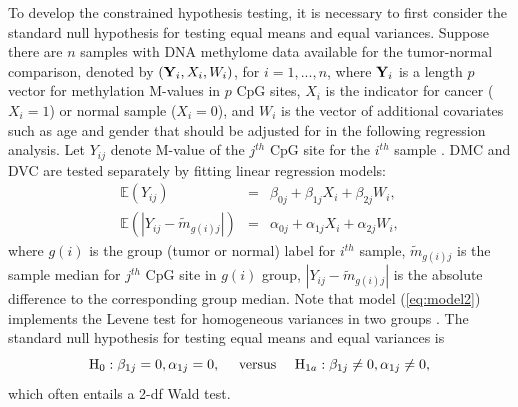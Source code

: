 \documentclass{statsoc}
\begin{document}
 To develop the constrained hypothesis testing, it is necessary to first consider the standard null hypothesis for testing equal means and equal variances. Suppose there are $n$ samples with DNA methylome data available for the tumor-normal comparison, denoted by $(\mbox{\bf Y}_i,X_i,W_i)$, for $i=1,...,n$, where $\mbox{\bf Y}_i$ is a length $p$ vector for methylation M-values in $p$ CpG sites, $X_i$ is the indicator for cancer ($X_i=1$) or normal sample ($X_i=0$), and $W_i$ is the vector of additional covariates such as age and gender that should be adjusted for in the following regression analysis. Let $Y_{ij}$ denote M-value of the $j^{th}$ CpG site for the $i^{th}$ sample . DMC and DVC are tested separately by fitting linear regression models:
\begin{eqnarray}
  \mathbb{E}(Y_{ij})&=& \beta_{0j} + \beta_{1j} X_i + \beta_{2j} W_i,  \label{eq:model1} \\
  \mathbb{E}(|Y_{ij} - \widetilde{m}_{g(i)j}|)&=& \alpha_{0j} + \alpha_{1j} X_i + \alpha_{2j}W_i,  \label{eq:model2}
\end{eqnarray}
where $g(i)$ is the group (tumor or normal) label for $i^{th}$ sample, $\widetilde{m}_{g(i)j}$ is the sample median for $j^{th}$ CpG site in $g(i)$ group, $|Y_{ij} - \widetilde{m}_{g(i)j}|$ is the absolute difference to the corresponding group median.  Note that model (\ref{eq:model2}) implements the Levene test for homogeneous variances in two groups \citep{Brown1974}. The standard null hypothesis for testing equal means and equal variances is
\[
\mbox{H}_{0}: \beta_{1j}=0, \alpha_{1j}=0, \mbox{\hspace{10pt} versus \hspace{10pt}}\mbox{H}_{1a}: \beta_{1j} \neq 0 , \alpha_{1j} \neq 0,
\]
which often entails a 2-df Wald test.
\end{document}

